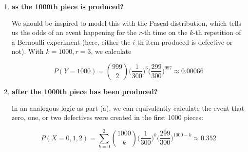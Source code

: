 \documentclass[10pt, oneside]{article}
\begin{document}
\begin{enumerate}[label=9.\arabic*]
\begin{enumerate}
	\item  \begin{tcolorbox}[
	  colback=Cerulean!5!white,
	  colframe=Cerulean!75!black]
	\textbf{as the 1000th piece is produced?}
	\end{tcolorbox}
	
	We should be inspired to model this with the Pascal distribution, which tells us the odds of an event happening for the $r$-th time on the $k$-th repetition of a Bernoulli experiment (here, either the $i$-th item produced is defective or not). With $k = 1000, r = 3$, we calculate
	
	\[ P(Y = 1000) = \binom{999}{2} \bigg( \frac{1}{300} \bigg)^3 \bigg( \frac{299}{300} \bigg)^{997} \approx \boxed{0.00066} \]
	
	\item  \begin{tcolorbox}[
	  colback=Cerulean!5!white,
	  colframe=Cerulean!75!black]
	\textbf{after the 1000th piece has been produced?}
	\end{tcolorbox}
	
	In an analogous logic as part (a), we can equivalently calculate the event that zero, one, or two defectives were created in the first 1000 pieces:
	
	\[ P(X = 0, 1, 2) = \sum^2_{k = 0} \binom{1000}{k} \bigg( \frac{1}{300} \bigg)^k \bigg( \frac{299}{300} \bigg)^{1000-k} \approx \boxed{0.352} \]
	\end{enumerate}

\end{enumerate}
\end{document}
